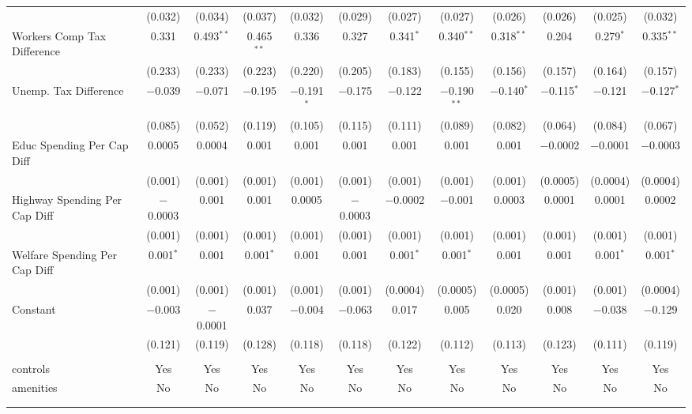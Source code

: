 \begin{table}[!htbp]
\begin{tabular}{@{\extracolsep{5pt}}lccccccccccc}
  & (0.032) & (0.034) & (0.037) & (0.032) & (0.029) & (0.027) & (0.027) & (0.026) & (0.026) & (0.025) & (0.032) \\ 
  Workers Comp Tax Difference & 0.331 & 0.493$^{**}$ & 0.465$^{**}$ & 0.336 & 0.327 & 0.341$^{*}$ & 0.340$^{**}$ & 0.318$^{**}$ & 0.204 & 0.279$^{*}$ & 0.335$^{**}$ \\ 
  & (0.233) & (0.233) & (0.223) & (0.220) & (0.205) & (0.183) & (0.155) & (0.156) & (0.157) & (0.164) & (0.157) \\ 
  Unemp. Tax Difference & $-$0.039 & $-$0.071 & $-$0.195 & $-$0.191$^{*}$ & $-$0.175 & $-$0.122 & $-$0.190$^{**}$ & $-$0.140$^{*}$ & $-$0.115$^{*}$ & $-$0.121 & $-$0.127$^{*}$ \\ 
  & (0.085) & (0.052) & (0.119) & (0.105) & (0.115) & (0.111) & (0.089) & (0.082) & (0.064) & (0.084) & (0.067) \\ 
  Educ Spending Per Cap Diff & 0.0005 & 0.0004 & 0.001 & 0.001 & 0.001 & 0.001 & 0.001 & 0.001 & $-$0.0002 & $-$0.0001 & $-$0.0003 \\ 
  & (0.001) & (0.001) & (0.001) & (0.001) & (0.001) & (0.001) & (0.001) & (0.001) & (0.0005) & (0.0004) & (0.0004) \\ 
  Highway Spending Per Cap Diff & $-$0.0003 & 0.001 & 0.001 & 0.0005 & $-$0.0003 & $-$0.0002 & $-$0.001 & 0.0003 & 0.0001 & 0.0001 & 0.0002 \\ 
  & (0.001) & (0.001) & (0.001) & (0.001) & (0.001) & (0.001) & (0.001) & (0.001) & (0.001) & (0.001) & (0.001) \\ 
  Welfare Spending Per Cap Diff & 0.001$^{*}$ & 0.001 & 0.001$^{*}$ & 0.001 & 0.001 & 0.001$^{*}$ & 0.001$^{*}$ & 0.001 & 0.001 & 0.001$^{*}$ & 0.001$^{*}$ \\ 
  & (0.001) & (0.001) & (0.001) & (0.001) & (0.001) & (0.0004) & (0.0005) & (0.0005) & (0.001) & (0.001) & (0.0004) \\ 
  Constant & $-$0.003 & $-$0.0001 & 0.037 & $-$0.004 & $-$0.063 & 0.017 & 0.005 & 0.020 & 0.008 & $-$0.038 & $-$0.129 \\ 
  & (0.121) & (0.119) & (0.128) & (0.118) & (0.118) & (0.122) & (0.112) & (0.113) & (0.123) & (0.111) & (0.119) \\ 
 \hline \\[-1.8ex] 
controls & Yes & Yes & Yes & Yes & Yes & Yes & Yes & Yes & Yes & Yes & Yes \\ 
amenities & No & No & No & No & No & No & No & No & No & No & No \\ 
\hline \\[-1.8ex] 
\hline 
\hline \\[-1.8ex] 
\end{tabular} 
\end{table} 
